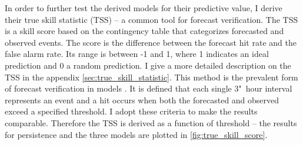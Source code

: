 In order to further test the derived models for their predictive value, I derive their true skill statistic (TSS) -- a common tool for forecast verification. The TSS is a skill score based on the contingency table that categorizes forecasted and observed events. The score is the difference between the forecast hit rate and the false alarm rate. Its range is between -1 and 1, where 1 indicates an ideal prediction and 0 a random prediction. I give a more detailed description on the TSS in the appendix \autoref{sec:true_skill_statistic}. This method is the prevalent form of forecast verification in \Kp{} models \citep{Detman1999,Wing2005,Savani2017}. It is defined that each single 3"~hour \Kp{} interval represents an event and a hit occurs when both the forecasted and observed \Kp{} exceed a specified threshold. I adopt these criteria to make the results comparable. Therefore the TSS is derived as a function of \Kp{} threshold -- the results for persistence and the three models are plotted in \autoref{fig:true_skill_score}.
\begin{figure}
\end{figure}

